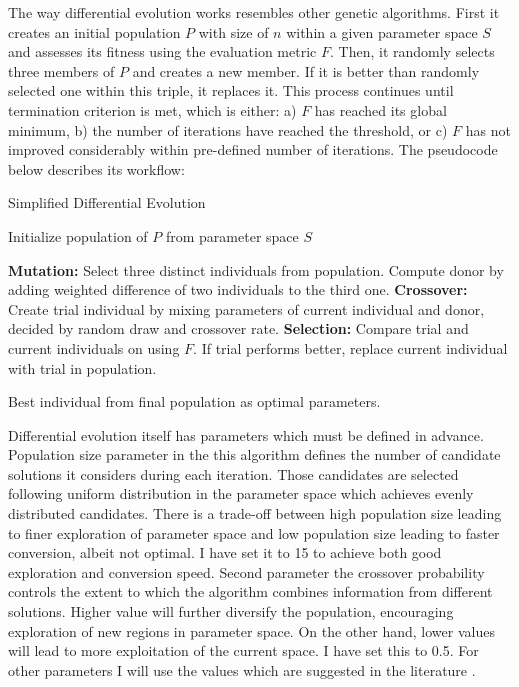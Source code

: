 \documentclass[a4paper,12pt]{article}
\begin{document}
The way differential evolution works resembles other genetic algorithms. First it creates an initial population $P$ with size of $n$ within a given parameter space $S$ and assesses its fitness using the evaluation metric $F$. Then, it randomly selects three members of $P$ and creates a new member. If it is better than randomly selected one within this triple, it replaces it. This process continues until termination criterion is met, which is either: a) $F$ has reached its global minimum, b) the number of iterations have reached the threshold, or c) $F$ has not improved considerably within pre-defined number of iterations. The pseudocode below describes its workflow:

\begin{algorithm}
\caption{Simplified Differential Evolution}
\begin{algorithmic}[1]

\State Initialize population of $P$ from parameter space $S$

        \State \textbf{Mutation:} Select three distinct individuals from population. Compute donor by adding weighted difference of two individuals to the third one.
        \State \textbf{Crossover:} Create trial individual by mixing parameters of current individual and donor, decided by random draw and crossover rate.
        \State \textbf{Selection:} Compare trial and current individuals on using $F$. If trial performs better, replace current individual with trial in population.
    \EndFor
\EndWhile

\State \Return Best individual from final population as optimal parameters.

\end{algorithmic}
\end{algorithm}

Differential evolution itself has parameters which must be defined in advance. Population size parameter in the this algorithm defines the number of candidate solutions it considers during each iteration. Those candidates are selected following uniform distribution in the parameter space which achieves evenly distributed candidates. There is a trade-off between high population size leading to finer exploration of parameter space and low population size leading to faster conversion, albeit not optimal. I have set it to 15 to achieve both good exploration and conversion speed. Second parameter the crossover probability controls the extent to which the algorithm combines information from different solutions. Higher value will further diversify the population, encouraging exploration of new regions in parameter space. On the other hand, lower values will lead to more exploitation of the current space. I have set this to 0.5. For other parameters I will use the values which are suggested in the literature \citep{omidi2020differential}.
\end{document}
